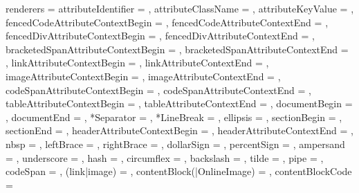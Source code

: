 renderers = {%
  attributeIdentifier = {%
    },
  attributeClassName = {%
    },
  attributeKeyValue = {%
    },
  fencedCodeAttributeContextBegin = {%
    },
  fencedCodeAttributeContextEnd = {%
    },
  fencedDivAttributeContextBegin = {%
    },
  fencedDivAttributeContextEnd = {%
    },
  bracketedSpanAttributeContextBegin = {%
    },
  bracketedSpanAttributeContextEnd = {%
    },
  linkAttributeContextBegin = {%
    },
  linkAttributeContextEnd = {%
    },
  imageAttributeContextBegin = {%
    },
  imageAttributeContextEnd = {%
    },
  codeSpanAttributeContextBegin = {%
    },
  codeSpanAttributeContextEnd = {%
    },
  tableAttributeContextBegin = {%
    },
  tableAttributeContextEnd = {%
    },
  documentBegin = {%
    },
  documentEnd = {%
    },
  *Separator = {%
    },
  *LineBreak = {%
    },
  ellipsis = {%
    },
  sectionBegin = {%
    },
  sectionEnd = {%
    },
  headerAttributeContextBegin = {%
    },
  headerAttributeContextEnd = {%
    },
  nbsp = {%
    },
  leftBrace = {%
    },
  rightBrace = {%
    },
  dollarSign = {%
    },
  percentSign = {%
    },
  ampersand = {%
    },
  underscore = {%
    },
  hash = {%
    },
  circumflex = {%
    },
  backslash = {%
    },
  tilde = {%
    },
  pipe = {%
    },
  codeSpan = {%
    },
  (link|image) = {%
    },
  contentBlock(|OnlineImage) = {%
    },
  contentBlockCode = {%
}}
